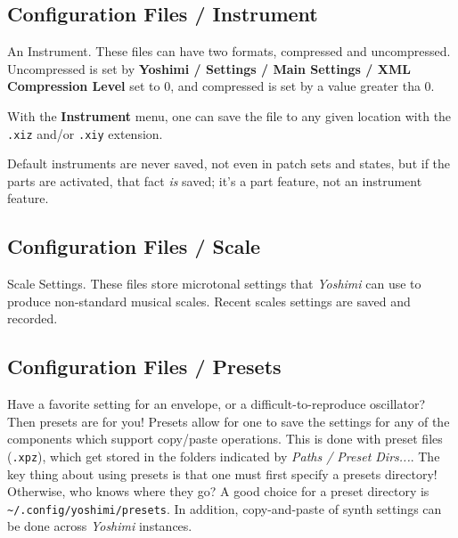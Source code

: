 \subsection{Configuration Files / Instrument}
\label{subsec:configuration_instrument}

   An Instrument.  These files can have two formats, compressed and
   uncompressed.
   Uncompressed is set by
   \textbf{Yoshimi / Settings / Main Settings / XML Compression Level} set to
   0, and compressed is set by a value greater tha 0.

   With the \textbf{Instrument} menu, one can save the file to any
   given location with the \texttt{.xiz} and/or \texttt{.xiy} extension.

   Default instruments are never saved, not even in patch sets and states, but
   if the parts are activated, that fact \textsl{is} saved; it's a part
   feature, not an instrument feature.

\subsection{Configuration Files / Scale}
\label{subsec:configuration_scale}

   Scale Settings.  These files store microtonal settings that \textsl{Yoshimi}
   can use to produce non-standard musical scales.  Recent scales settings are
   saved and recorded.

\subsection{Configuration Files / Presets}
\label{subsec:configuration_preset}

   Have a favorite setting for an envelope, or a difficult-to-reproduce
   oscillator? Then presets are for you! Presets allow for one to save the
   settings for any of the components which support copy/paste operations.
   This is done with preset files (\texttt{.xpz}), which get stored in the
   folders indicated by \textsl{Paths / Preset Dirs...}.
   The key thing about using presets is that one must first
   specify a presets directory!  Otherwise, who knows where they go?
   A good choice for a preset directory is
   \texttt{\textasciitilde/.config/yoshimi/presets}.
   In addition, copy-and-paste of synth settings can be done across
   \textsl{Yoshimi} instances.


